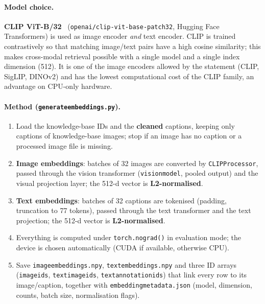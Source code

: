 \documentclass[11pt,a4paper]{article}
\renewcommand{\_}{\textunderscore\allowbreak{}}
\newcommand{\code}[1]{\texttt{#1}}
\begin{document}
\paragraph{Model choice.} \textbf{CLIP ViT-B/32}~\cite{clip} (\code{openai/clip-vit-base-patch32}, Hugging Face Transformers) is used as image encoder \emph{and} text encoder. CLIP is trained contrastively so that matching image/text pairs have a high cosine similarity; this makes cross-modal retrieval possible with a single model and a single index dimension (512). It is one of the image encoders allowed by the statement (CLIP, SigLIP, DINOv2) and has the lowest computational cost of the CLIP family, an advantage on CPU-only hardware.

\paragraph{Method (\code{generate\_embeddings.py}).}
\begin{enumerate}[nosep]
  \item Load the knowledge-base IDs and the \textbf{cleaned} captions, keeping only captions of knowledge-base images; stop if an image has no caption or a processed image file is missing.
  \item \textbf{Image embeddings}: batches of 32 images are converted by \code{CLIPProcessor}, passed through the vision transformer (\code{vision\_model}, pooled output) and the visual projection layer; the 512-d vector is \textbf{L2-normalised}.
  \item \textbf{Text embeddings}: batches of 32 captions are tokenised (padding, truncation to 77 tokens), passed through the text transformer and the text projection; the 512-d vector is \textbf{L2-normalised}.
  \item Everything is computed under \code{torch.no\_grad()} in evaluation mode; the device is chosen automatically (CUDA if available, otherwise CPU).
  \item Save \code{image\_embeddings.npy}, \code{text\_embeddings.npy} and three ID arrays (\code{image\_ids}, \code{text\_image\_ids}, \code{text\_annotation\_ids}) that link every row to its image/caption, together with \code{embedding\_metadata.json} (model, dimension, counts, batch size, normalisation flags).
\end{enumerate}
\end{document}
